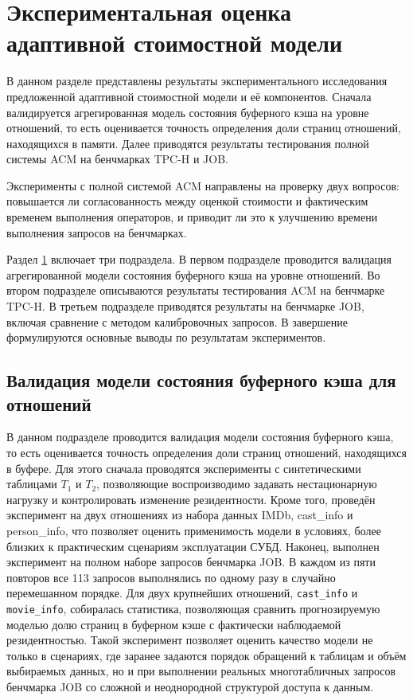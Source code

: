 \section{Экспериментальная оценка адаптивной стоимостной модели}\label{sec:ch2/sec5}

В данном разделе представлены результаты экспериментального исследования предложенной адаптивной стоимостной модели и её компонентов. Сначала валидируется агрегированная модель состояния буферного кэша на уровне отношений, то есть оценивается точность определения доли страниц отношений, находящихся в памяти. Далее приводятся результаты тестирования полной системы ACM на бенчмарках TPC-H и JOB.

Эксперименты с полной системой ACM направлены на проверку двух вопросов: повышается ли согласованность между оценкой стоимости и фактическим временем выполнения операторов, и приводит ли это к улучшению времени выполнения запросов на бенчмарках.

Раздел \cref{sec:ch2/sec5} включает три подраздела. В первом подразделе проводится валидация агрегированной модели состояния буферного кэша на уровне отношений. Во втором подразделе описываются результаты тестирования ACM на бенчмарке TPC-H. В третьем подразделе приводятся результаты на бенчмарке JOB, включая сравнение с методом калибровочных запросов. В завершение формулируются основные выводы по результатам экспериментов.

\subsection{Валидация модели состояния буферного кэша для отношений}

В данном подразделе проводится валидация модели состояния буферного кэша, то есть оценивается точность определения доли страниц отношений, находящихся в буфере. Для этого сначала проводятся эксперименты с синтетическими таблицами \(T_1\) и \(T_2\), позволяющие воспроизводимо задавать нестационарную нагрузку и контролировать изменение резидентности. Кроме того, проведён эксперимент на двух отношениях из набора данных IMDb, cast\_info и person\_info, что позволяет оценить применимость модели в условиях, более близких к практическим сценариям эксплуатации СУБД. Наконец, выполнен эксперимент на полном наборе запросов бенчмарка JOB.
В каждом из пяти повторов все 113 запросов выполнялись по одному разу
в случайно перемешанном порядке. Для двух крупнейших отношений,
\texttt{cast\_info} и \texttt{movie\_info}, собиралась статистика,
позволяющая сравнить прогнозируемую моделью долю страниц в буферном кэше
с фактически наблюдаемой резидентностью. Такой эксперимент позволяет оценить качество модели не только в сценариях, где заранее задаются порядок обращений к таблицам и объём выбираемых данных, но и при выполнении реальных многотабличных запросов бенчмарка JOB со сложной и неоднородной структурой доступа к данным.

